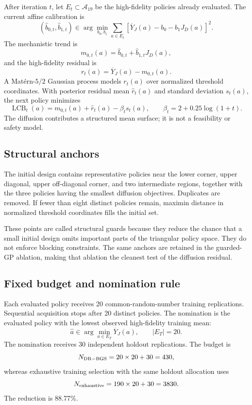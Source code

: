 \documentclass[futureinternet,supfile,submit,moreauthors]{Definitions/mdpi}
\newcommand{\Aset}{\mathcal A}
\begin{document}
After iteration \(t\), let \(E_t\subset\Aset_{19}\) be the high-fidelity
policies already evaluated. The current affine calibration is
\[
(\widehat b_{0,t},\widehat b_{1,t})
\in
\arg\min_{b_0,b_1}
\sum_{a\in E_t}
\left[
\overline Y_J(a)-b_0-b_1J_D(a)
\right]^2.
\]
The mechanistic trend is
\[
m_{0,t}(a)
=
\widehat b_{0,t}
+
\widehat b_{1,t}J_D(a),
\]
and the high-fidelity residual is
\[
r_t(a)
=
\overline Y_J(a)-m_{0,t}(a).
\]
A Mat\'ern-\(5/2\) Gaussian process models \(r_t(a)\) over normalized
threshold coordinates. With posterior residual mean \(\widehat r_t(a)\) and
standard deviation \(s_t(a)\), the next policy minimizes
\[
\operatorname{LCB}_t(a)
=
m_{0,t}(a)+\widehat r_t(a)-\beta_ts_t(a),
\qquad
\beta_t=2+0.25\log(1+t).
\]
The diffusion contributes a structured mean surface; it is not a feasibility
or safety model.

\subsection{Structural anchors}

The initial design contains representative policies near the lower corner,
upper diagonal, upper off-diagonal corner, and two intermediate regions,
together with the three policies having the smallest diffusion objectives.
Duplicates are removed. If fewer than eight distinct policies remain,
maximin distance in normalized threshold coordinates fills the initial set.

These points are called structural guards because they reduce the chance that
a small initial design omits important parts of the triangular policy space.
They do not enforce blocking constraints. The same anchors are retained in
the guarded-GP ablation, making that ablation the cleanest test of the
diffusion residual.

\subsection{Fixed budget and nomination rule}

Each evaluated policy receives 20 common-random-number training replications.
Sequential acquisition stops after 20 distinct policies. The nomination is
the evaluated policy with the lowest observed high-fidelity training mean:
\[
\widehat a
\in
\arg\min_{a\in E_T}\overline Y_J(a),
\qquad
|E_T|=20.
\]
The nomination receives 30 independent holdout replications. The budget is
\[
N_{\rm DR-BGS}
=
20\times20+30
=
430,
\]
whereas exhaustive training selection with the same holdout allocation uses
\[
N_{\rm exhaustive}
=
190\times20+30
=
3830.
\]
The reduction is 88.77\%.
\end{document}

